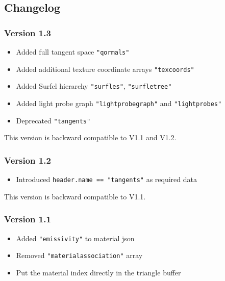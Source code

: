 \documentclass[english,10pt,a4paper,twocolumn,colorscheme=green]{orarticle}
\begin{document}
	\subsection{Changelog}
	\subsubsection{Version 1.3}
	\begin{itemize}
		\item Added full tangent space \lstinline|"qormals"|
		\item Added additional texture coordinate arrays \lstinline|"texcoords"|
		\item Added Surfel hierarchy \lstinline|"surfles"|, \lstinline|"surfletree"|
		\item Added light probe graph \lstinline|"lightprobegraph"| and \lstinline|"lightprobes"|
		\item Deprecated \lstinline|"tangents"|
	\end{itemize}
	This version is backward compatible to V1.1 and V1.2.
	\subsubsection{Version 1.2}
	\begin{itemize}
		\item Introduced \lstinline|header.name == "tangents"| as required data
	\end{itemize}
	This version is backward compatible to V1.1.
	\subsubsection{Version 1.1}
	\begin{itemize}
		\item Added \lstinline|"emissivity"| to material json
		\item Removed \lstinline|"materialassociation"| array
		\item Put the material index directly in the triangle buffer
	\end{itemize}
\end{document}
